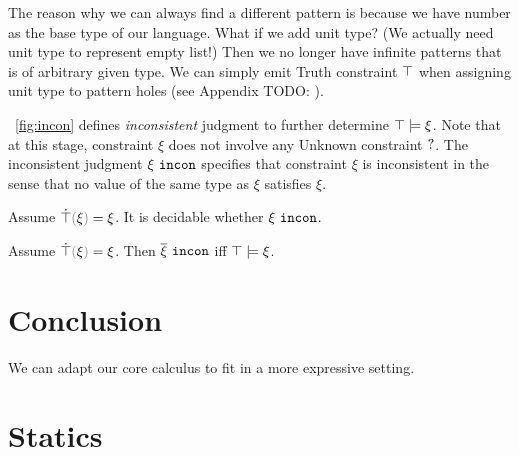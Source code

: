 \documentclass[runningheads,envcountsame,a4paper]{llncs}
\newcommand{\todo}[1]{{\color{red} TODO: #1}}
\begin{document}
The reason why we can always find a different pattern is because we have number as the base type of our language. What if we add unit type? (We actually need unit type to represent empty list!) Then we no longer have infinite patterns that is of arbitrary given type. We can simply emit Truth constraint $\top$ when assigning unit type to pattern holes (see Appendix \todo{}).

\figurename~\ref{fig:incon} defines \textit{inconsistent} judgment to further determine $\top \models \xi$. Note that at this stage, constraint $\xi$ does not involve any Unknown constraint $\mathtt{?}$. The inconsistent judgment $\xi ~\mathtt{incon}$ specifies that constraint $\xi$ is inconsistent in the sense that no value of the same type as $\xi$ satisfies $\xi$.



\begin{theorem}
  Assume $\ctruify{\xi}=\xi$. It is decidable whether $\xi ~\mathtt{incon}$.
\end{theorem}

\begin{theorem}
  Assume $\ctruify{\xi}=\xi$. Then $\overline{\xi} ~\mathtt{incon}$ iff $\top \models \xi$.
\end{theorem}

\section{Conclusion}
We can adapt our core calculus to fit in a more expressive setting.
\clearpage




\appendix
\section{Statics}
\end{document}
